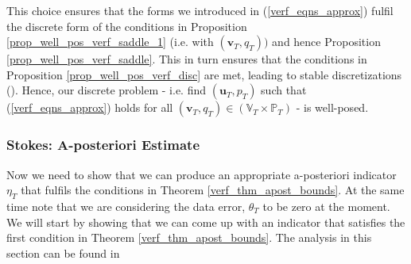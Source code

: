 \documentclass[12pt,a4paper]{article}
\theoremstyle{definition}
\begin{document}
This choice ensures that the forms we introduced in (\ref{verf_eqns_approx}) fulfil the discrete form of the conditions in Proposition \ref{prop_well_pos_verf_saddle_1} (i.e. with $(\textbf{v}_T,q_T))$ and hence Proposition \ref{prop_well_pos_verf_saddle}.  This in turn ensures that the conditions in Proposition \ref{prop_well_pos_verf_disc} are met, leading to stable discretizations (\cite{verfurth2013posteriori}).  Hence, our discrete problem - i.e. find $\left(\textbf{u}_T, p_T\right)$ such that (\ref{verf_eqns_approx}) holds for all $\left(\textbf{v}_T,q_T\right)\in \left(\mathbb{V}_T\times \mathbb{P}_T\right)$ - is well-posed.

\subsubsection{Stokes: A-posteriori Estimate}\label{a_posteriori_stokes}

Now we need to show that we can produce an appropriate a-posteriori indicator $\eta_T$ that fulfils the conditions in Theorem \ref{verf_thm_apost_bounds}.  At the same time note that we are considering the data error, $\theta_T$ to be zero at the moment.  We will start by showing that we can come up with an indicator that satisfies the first condition in Theorem \ref{verf_thm_apost_bounds}.    The analysis in this section can be found in \cite[\S4.10.3]{verfurth2013posteriori}
\end{document}

